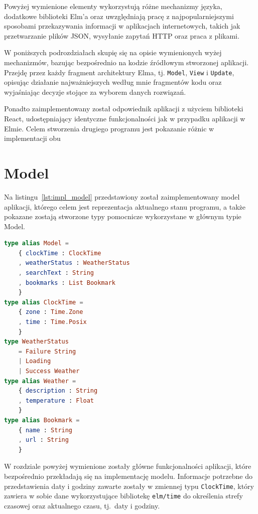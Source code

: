\documentclass[twoside,a4paper]{report}
\begin{document}
Powyżej wymienione elementy wykorzystują różne mechanizmy języka, dodatkowe biblioteki Elm'a oraz uwzględniają pracę z najpopularniejszymi sposobami przekazywania informacji w aplikacjach internetowych, takich jak przetwarzanie plików JSON, wysyłanie zapytań HTTP oraz praca z plikami.

W poniższych podrozdziałach skupię się na opisie wymienionych wyżej mechanizmów, bazując bezpośrednio na kodzie źródłowym stworzonej aplikacji.
Przejdę przez każdy fragment architektury Elma, tj. \texttt{Model}, \texttt{View} i \texttt{Update}, opisując działanie najważniejszych według mnie fragmentów kodu oraz wyjaśniając decyzje stojące za wyborem danych rozwiązań.

Ponadto zaimplementowany został odpowiednik aplikacji z użyciem biblioteki React, udostępniający identyczne funkcjonalności jak w przypadku aplikacji w Elmie. Celem stworzenia drugiego programu jest pokazanie różnic w implementacji obu

\section{Model}
Na listingu~\ref{lst:impl_model} przedstawiony został zaimplementowany model aplikacji, którego celem jest reprezentacja aktualnego stanu programu, a także pokazane zostają stworzone typy pomocnicze wykorzystane w głównym typie Model.

\begin{lstlisting}[caption={\textit{}Pełen model aplikacji},label={lst:impl_model},language={Elm}]
type alias Model =
    { clockTime : ClockTime
    , weatherStatus : WeatherStatus
    , searchText : String
    , bookmarks : List Bookmark
    }
type alias ClockTime =
    { zone : Time.Zone
    , time : Time.Posix
    }
type WeatherStatus
    = Failure String
    | Loading
    | Success Weather
type alias Weather =
    { description : String
    , temperature : Float
    }
type alias Bookmark =
    { name : String
    , url : String
    }
\end{lstlisting}

W rozdziale powyżej wymienione zostały główne funkcjonalności aplikacji, które bezpośrednio przekładają się na implementację modelu.
Informacje potrzebne do przedstawienia daty i godziny zawarte zostały w zmiennej typu \texttt{ClockTime}, który zawiera w sobie dane wykorzystujące bibliotekę \texttt{elm/time} do określenia strefy czasowej oraz aktualnego czasu, tj.~daty i godziny.
\end{document}
